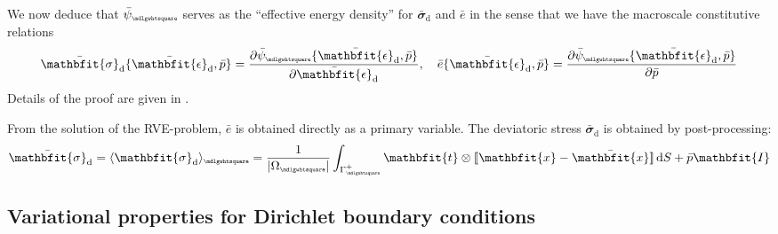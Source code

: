 \documentclass[12pt,a4paper]{article}
\renewcommand{\ta}[1]{\mathbfit{#1}}
\renewcommand{\ts}[1]{\mathbfit{#1}}
\renewcommand{\Box}{\mdlgwhtsquare}
\DeclarePairedDelimiter{\homgen}{\langle}{\rangle_\rve}
\DeclarePairedDelimiter{\jmp}{[\![}{]\!]}
\renewcommand{\dev}{\mathrm{d}}
\newcommand{\volume}{|\Omega_\rve|}
\newcommand{\rve}{
  {\mathchoice
   {\mbox{\scalebox{0.67}{$\Box$}}}
   {\mbox{\scalebox{0.67}{$\Box$}}}
   {\mbox{\scalebox{0.5}{$\Box$}}}
   {\mbox{\scalebox{0.375}{$\Box$}}}
  }
}
\begin{document}
We now deduce that $\bar{\psi}_\rve$ serves as the ``effective energy density'' for $\bar{\ts\sigma}_\dev$ and $\bar{e}$ in the sense that we have the macroscale constitutive relations
\begin{equation}
    \bar{\ts\sigma}_\dev\{\bar{\ts\epsilon}_\dev,\bar{p}\} = \frac{\partial \bar{\psi}_\rve\{\bar{\ts\epsilon}_\dev,\bar{p}\}}{\partial \bar{\ts\epsilon}_\dev}, \quad
     \bar{e}\{\bar{\ts\epsilon}_\dev,\bar{p}\} = \frac{\partial \bar{\psi}_\rve\{\bar{\ts\epsilon}_\dev,\bar{p}\}}{\partial \bar{p}}
\label{eq88}
\end{equation}
Details of the proof are given in .

From the solution of the RVE-problem, $\bar{e}$ is obtained directly as a primary variable.
The deviatoric stress $\bar{\ts\sigma}_\dev$ is obtained by post-processing:
\begin{align}
 \bar{\ts\sigma}_\dev = \homgen{\ts\sigma_\dev} = \frac{1}{\volume} \int_{\Gamma_\rve^+} \ta t \outerp \jmp{\ta x - \bar{\ta x}}\dif S + \bar{p}\ts I
\label{eq:weak_periodic_sigma_dev}
\end{align}


\subsection{Variational properties for Dirichlet boundary conditions}
\end{document}
